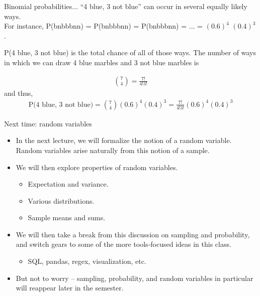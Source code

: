 \documentclass[aspectratio=169]{../latex_main/tntbeamer}  %
\begin{document}
	
		\begin{frame}{Binomial probabilities...}
	“4 blue, 3 not blue” can occur in several equally likely ways.\\                     For instance, P(bnbbbnn) = P(bnbbbnn) = P(bnbbbnn) = ... = $(0.6)^4$ $(0.4)^3$. \\         \bigskip
	    
	    P(4 blue, 3 not blue) is the total chance of all of those ways. The number of ways in which we can draw 4 blue marbles and 3 not blue marbles is

        \begin{align*}
            \binom{7}{4} = \frac{7!}{4!3!}
        \end{align*}
    and thus,
    \begin{align*}
        \text{P(4 blue, 3 not blue)} = \binom{7}{4}(0.6)^4 (0.4)^3 = \frac{7!}{4!3!}(0.6)^4 (0.4)^3
    \end{align*}

	\end{frame}
	
	
	\begin{frame}{Next time: random variables}
    	\begin{itemize}
    	    \item In the next lecture, we will formalize the notion of a random variable. Random variables arise naturally from this notion of a sample.
    	    \item We will then explore properties of random variables. 
    	    \begin{itemize}
    	        \item Expectation and variance.
    	        \item Various distributions.
    	        \item Sample means and sums.
    	    \end{itemize}
    	    \item We will then take a break from this discussion on sampling and probability, and switch gears to some of the more tools-focused ideas in this class. 
    	    \begin{itemize}
    	        \item SQL, pandas, regex, visualization, etc.
    	    \end{itemize}
    	    \item But not to worry – sampling, probability, and random variables in particular will reappear later in the semester.
    	\end{itemize}

	\end{frame}
\end{document}
